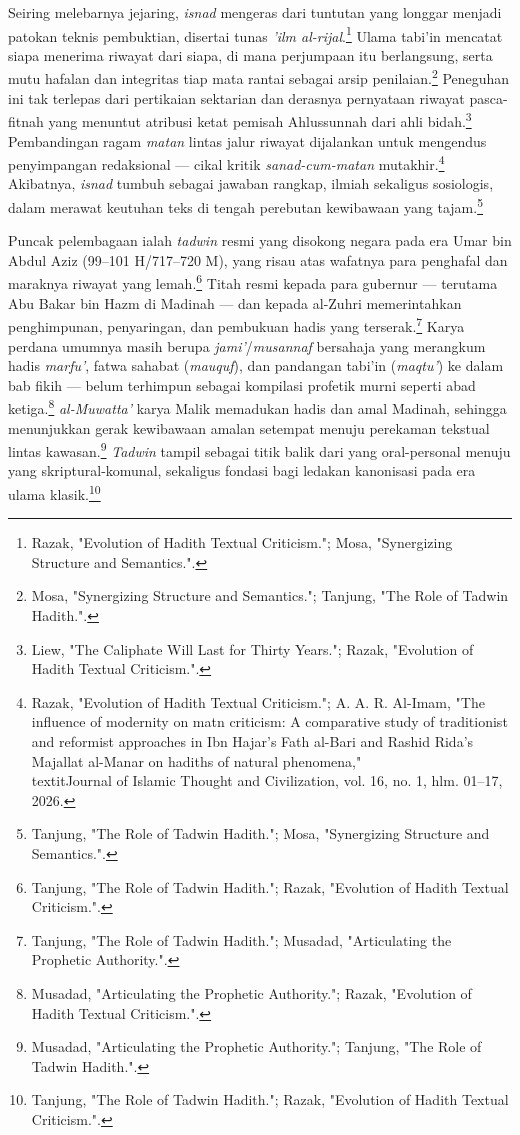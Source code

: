 Seiring melebarnya jejaring, \textit{isnad} mengeras dari tuntutan yang longgar menjadi patokan teknis pembuktian, disertai tunas \textit{'ilm al-rijal}.\footnote{Razak, "Evolution of Hadith Textual Criticism."; Mosa, "Synergizing Structure and Semantics.".} Ulama tabi'in mencatat siapa menerima riwayat dari siapa, di mana perjumpaan itu berlangsung, serta mutu hafalan dan integritas tiap mata rantai sebagai arsip penilaian.\footnote{Mosa, "Synergizing Structure and Semantics."; Tanjung, "The Role of Tadwin Hadith.".} Peneguhan ini tak terlepas dari pertikaian sektarian dan derasnya pernyataan riwayat pasca-fitnah yang menuntut atribusi ketat pemisah Ahlussunnah dari ahli bidah.\footnote{Liew, "The Caliphate Will Last for Thirty Years."; Razak, "Evolution of Hadith Textual Criticism.".} Pembandingan ragam \textit{matan} lintas jalur riwayat dijalankan untuk mengendus penyimpangan redaksional --- cikal kritik \textit{sanad-cum-matan} mutakhir.\footnote{Razak, "Evolution of Hadith Textual Criticism."; A. A. R. Al-Imam, "The influence of modernity on matn criticism: A comparative study of traditionist and reformist approaches in Ibn Hajar's Fath al-Bari and Rashid Rida's Majallat al-Manar on hadiths of natural phenomena," \\textit{Journal of Islamic Thought and Civilization}, vol. 16, no. 1, hlm. 01--17, 2026.} Akibatnya, \textit{isnad} tumbuh sebagai jawaban rangkap, ilmiah sekaligus sosiologis, dalam merawat keutuhan teks di tengah perebutan kewibawaan yang tajam.\footnote{Tanjung, "The Role of Tadwin Hadith."; Mosa, "Synergizing Structure and Semantics.".}

Puncak pelembagaan ialah \textit{tadwin} resmi yang disokong negara pada era Umar bin Abdul Aziz (99--101 H/717--720 M), yang risau atas wafatnya para penghafal dan maraknya riwayat yang lemah.\footnote{Tanjung, "The Role of Tadwin Hadith."; Razak, "Evolution of Hadith Textual Criticism.".} Titah resmi kepada para gubernur --- terutama Abu Bakar bin Hazm di Madinah --- dan kepada al-Zuhri memerintahkan penghimpunan, penyaringan, dan pembukuan hadis yang terserak.\footnote{Tanjung, "The Role of Tadwin Hadith."; Musadad, "Articulating the Prophetic Authority.".} Karya perdana umumnya masih berupa \textit{jami'}/\textit{musannaf} bersahaja yang merangkum hadis \textit{marfu'}, fatwa sahabat (\textit{mauquf}), dan pandangan tabi'in (\textit{maqtu'}) ke dalam bab fikih --- belum terhimpun sebagai kompilasi profetik murni seperti abad ketiga.\footnote{Musadad, "Articulating the Prophetic Authority."; Razak, "Evolution of Hadith Textual Criticism.".} \textit{al-Muwatta'} karya Malik memadukan hadis dan amal Madinah, sehingga menunjukkan gerak kewibawaan amalan setempat menuju perekaman tekstual lintas kawasan.\footnote{Musadad, "Articulating the Prophetic Authority."; Tanjung, "The Role of Tadwin Hadith.".} \textit{Tadwin} tampil sebagai titik balik dari yang oral-personal menuju yang skriptural-komunal, sekaligus fondasi bagi ledakan kanonisasi pada era ulama klasik.\footnote{Tanjung, "The Role of Tadwin Hadith."; Razak, "Evolution of Hadith Textual Criticism.".}

